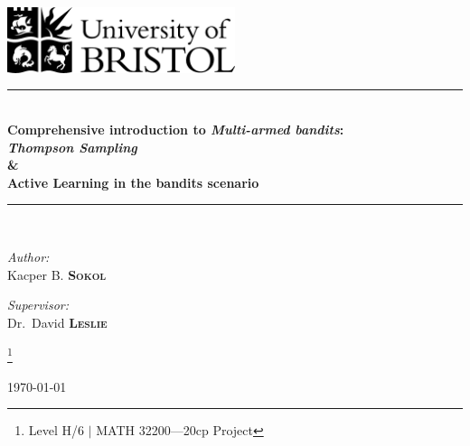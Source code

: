 \documentclass[12pt, a4paper, pdflatex, leqno]{report}
\newcommand{\HRule}{\rule{\linewidth}{0.5mm}}
\begin{document}
\begin{titlepage}
\begin{center}
\includegraphics[width=0.5\textwidth]{graphics/UOB-logo.png}~\\[2.5cm] %




\HRule \\[0.4cm]
{ \huge \bfseries %
	Comprehensive introduction to \emph{\textbf{Multi-armed bandits}}:\\[.5cm]
  \emph{Thompson Sampling}\\
  \&\\
  Active Learning in the bandits scenario\\[0.4cm] }
\HRule \\[1.5cm]

\begin{minipage}{0.4\textwidth}
\begin{flushleft} \large
\emph{Author:}\\
Kacper B. \textsc{\textbf{Sokol}}
\end{flushleft}
\end{minipage}
\begin{minipage}{0.4\textwidth}
\begin{flushright} \large
\emph{Supervisor:} \\
Dr.~David \textsc{\textbf{Leslie}}
\end{flushright}
\end{minipage}

\let\thefootnote\relax\footnote{Level H/6 $|$ MATH 32200---20cp Project}

\vfill

{\large \today}
\end{center}
\end{titlepage}
\end{document}
